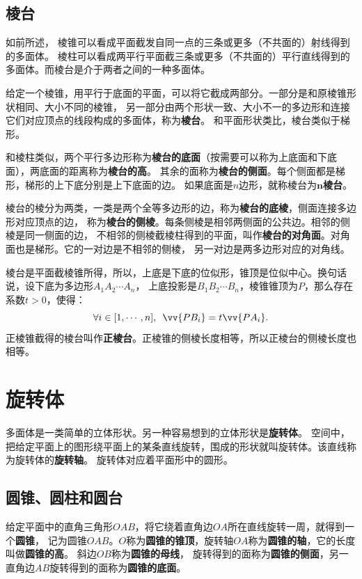 \documentclass[12pt,UTF8]{ctexbook}
\begin{document}
\section{棱台}
如前所述，
棱锥可以看成平面截发自同一点的三条或更多（不共面的）射线得到的多面体。
棱柱可以看成两平行平面截三条或更多（不共面的）平行直线得到的多面体。而棱台是介于两者之间的一种多面体。

给定一个棱锥，用平行于底面的平面，可以将它截成两部分。一部分是和原棱锥形状相同、大小不同的棱锥，
另一部分由两个形状一致、大小不一的多边形和连接它们对应顶点的线段构成的多面体，称为\textbf{棱台}。
和平面形状类比，棱台类似于梯形。

和棱柱类似，两个平行多边形称为\textbf{棱台的底面}（按需要可以称为上底面和下底面），两底面的距离称为\textbf{棱台的高}。
其余的面称为\textbf{棱台的侧面}。每个侧面都是梯形，梯形的上下底分别是上下底面的边。
如果底面是$n$边形，就称棱台为$\mathbf{n}$\textbf{棱台}。

棱台的棱分为两类，一类是两个全等多边形的边，称为\textbf{棱台的底棱}，侧面连接多边形对应顶点的边，
称为\textbf{棱台的侧棱}。每条侧棱是相邻两侧面的公共边。相邻的侧棱是同一侧面的边，
不相邻的侧棱截棱柱得到的平面，叫作\textbf{棱台的对角面}。对角面也是梯形。它的一对边是不相邻的侧棱，
另一对边是两多边形对应的对角线。

棱台是平面截棱锥所得，所以，上底是下底的位似形，锥顶是位似中心。换句话说，设下底为多边形$A_1A_2\cdots A_n$，
上底投影是$B_1B_2\cdots B_n$，棱锥锥顶为$P$，那么存在系数$t>0$，使得：
$$\forall i\in[1,\cdots ,n],\,\,\,\vv{PB_i} = t\vv{PA_i}.$$
正棱锥截得的棱台叫作\textbf{正棱台}。正棱锥的侧棱长度相等，所以正棱台的侧棱长度也相等。

\chapter{旋转体}

多面体是一类简单的立体形状。另一种容易想到的立体形状是\textbf{旋转体}。
空间中，把给定平面上的图形绕平面上的某条直线旋转，围成的形状就叫旋转体。该直线称为旋转体的\textbf{旋转轴}。
旋转体对应着平面形中的圆形。

\section{圆锥、圆柱和圆台}

给定平面中的直角三角形$OAB$，将它绕着直角边$OA$所在直线旋转一周，就得到一个\textbf{圆锥}，
记为圆锥$OAB$。$O$称为\textbf{圆锥的锥顶}，旋转轴$OA$称为\textbf{圆锥的轴}，它的长度叫做\textbf{圆锥的高}。
斜边$OB$称为\textbf{圆锥的母线}，
旋转得到的面称为\textbf{圆锥的侧面}，另一直角边$AB$旋转得到的面称为\textbf{圆锥的底面}。
\end{document}
